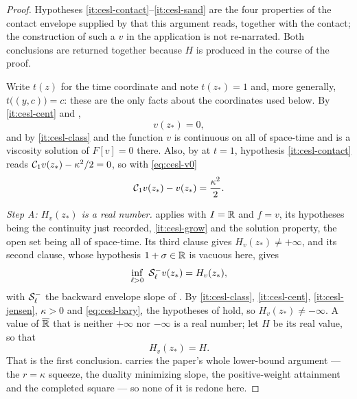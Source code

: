 \begin{proof}
Hypotheses \ref{it:cesl-contact}--\ref{it:cesl-sand} are the four properties of
the contact envelope supplied by  that this
argument reads, together with the contact; the construction of such a $v$ in
the application is not re-narrated. Both conclusions are returned together
because $H$ is produced in the course of the proof.

Write $t(z)$ for the time coordinate and note $t(z_*)=1$ and, more generally,
$t\bigl((y,c)\bigr)=c$: these are the only facts about the coordinates used
below. By \ref{it:cesl-cent} and ,
\begin{equation}\label{eq:cesl-v0}
  v(z_*)=0 ,
\end{equation}
and by \ref{it:cesl-class} and  the function $v$ is
continuous on all of space-time and is a viscosity solution of $F[v]=0$ there.
Also, by  at $t=1$, hypothesis \ref{it:cesl-contact} reads
$\mathcal{C}_1v(z_*)-\kappa^2/2=0$, so with \eqref{eq:cesl-v0}
\begin{equation}\label{eq:cesl-bary}
  \mathcal{C}_1v(z_*)-v(z_*)=\frac{\kappa^2}{2} .
\end{equation}

\emph{Step A: $H_v(z_*)$ is a real number.} 
applies with $I=\mathbb{R}$ and $f=v$, its hypotheses being the continuity just
recorded, \ref{it:cesl-grow} and the solution property, the open set being all
of space-time. Its third clause gives $H_v(z_*)\ne+\infty$, and its second
clause, whose hypothesis $1+\sigma\in\mathbb{R}$ is vacuous here, gives
\begin{equation}\label{eq:cesl-ham}
  \inf_{\ell>0}\ \mathcal{S}_\ell^-v(z_*)=H_v(z_*) ,
\end{equation}
with $\mathcal{S}_\ell^-$ the backward envelope slope of . By
\ref{it:cesl-class}, \ref{it:cesl-cent}, \ref{it:cesl-jensen}, $\kappa>0$ and
\eqref{eq:cesl-bary}, the hypotheses of  hold, so
$H_v(z_*)\ne-\infty$. A value of $\overline{\mathbb{R}}$ that is neither $+\infty$ nor
$-\infty$ is a real number; let $H$ be its real value, so that
\begin{equation}\label{eq:cesl-H}
  H_v(z_*)=H .
\end{equation}
That is the first conclusion.  carries the paper's
whole lower-bound argument --- the $r=\kappa$ squeeze, the duality minimizing
slope, the positive-weight attainment and the completed square --- so none of
it is redone here.


\end{proof}

